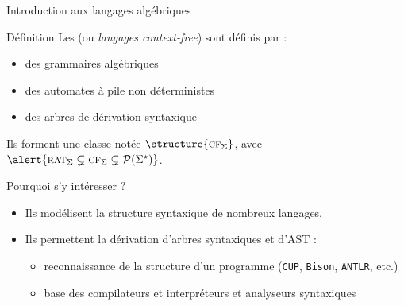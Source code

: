 
\begingroup

\begin{frame}{Introduction aux langages algébriques}

  \begin{block}{Définition}
    Les  (ou \emph{langages context-free}) sont définis par :
    \begin{itemize}
      \item des grammaires algébriques
      \item des automates à pile non déterministes
      \item des arbres de dérivation syntaxique
    \end{itemize}
    Ils forment une classe notée $\structure{\textsc{cf}_\Sigma}$, avec $\alert{\textsc{rat}_\Sigma \subsetneq \textsc{cf}_\Sigma \subsetneq \mathcal{P}(\Sigma^\star)}$.
  \end{block}

  \begin{block}{Pourquoi s'y intéresser ?}
    \begin{itemize}
      \item Ils modélisent la structure syntaxique de nombreux langages.
      \item Ils permettent la dérivation d’arbres syntaxiques et d'AST :
        \begin{itemize}
          \item reconnaissance de la structure d’un programme (\texttt{CUP}, \texttt{Bison}, \texttt{ANTLR}, etc.)
          \item base des compilateurs et interpréteurs et analyseurs syntaxiques
        \end{itemize}
    \end{itemize}
  \end{block}

\end{frame}

\endgroup
\endinput
